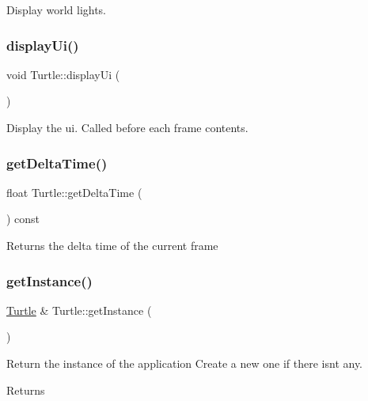 Display world lights. 

\mbox{\label{classTurtle_a6150d70ce0dc15374d434be05ea0b75e}} 
\subsubsection{\texorpdfstring{display\+Ui()}{displayUi()}}
{\footnotesize\ttfamily void Turtle\+::display\+Ui (\begin{DoxyParamCaption}{ }\end{DoxyParamCaption})}



Display the ui. Called before each frame contents. 

\mbox{\label{classTurtle_a0dcb4f2259a8f54bdd45988c11ead3c7}} 
\subsubsection{\texorpdfstring{get\+Delta\+Time()}{getDeltaTime()}}
{\footnotesize\ttfamily float Turtle\+::get\+Delta\+Time (\begin{DoxyParamCaption}{ }\end{DoxyParamCaption}) const}

Returns the delta time of the current frame \mbox{\label{classTurtle_aef2d0d0d699166d2de62af68e716757b}} 
\subsubsection{\texorpdfstring{get\+Instance()}{getInstance()}}
{\footnotesize\ttfamily \hyperlink{classTurtle}{Turtle} \& Turtle\+::get\+Instance (\begin{DoxyParamCaption}{ }\end{DoxyParamCaption})\hspace{0.3cm}{\ttfamily [static]}}



Return the instance of the application Create a new one if there isn\textquotesingle{}t any. 

\begin{DoxyReturn}{Returns}

\end{DoxyReturn}
\mbox{\label{classTurtle_ac2be48e2f6b5df9581b0b346038771b3}} 
